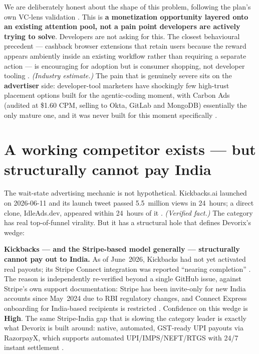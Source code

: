 We are deliberately honest about the shape of this problem, following the
plan's own VC-lens validation \citep{masterplan_2026}. This is
\textbf{a monetization opportunity layered onto an existing attention pool, not
a pain point developers are actively trying to solve}. Developers are not
asking for this. The closest behavioural precedent --- cashback browser
extensions that retain users because the reward appears ambiently inside an
existing workflow rather than requiring a separate action --- is encouraging
for adoption but is consumer shopping, not developer tooling
\citep{customerproduct_2026}. \emph{(Industry estimate.)} The pain that is
genuinely severe sits on the \textbf{advertiser} side: developer-tool marketers
have shockingly few high-trust placement options built for the agentic-coding
moment, with Carbon Ads (audited at \$1.60 CPM, selling to Okta, GitLab and
MongoDB) essentially the only mature one, and it was never built for this
moment specifically \citep{masterplan_2026}.

\section{A working competitor exists --- but structurally cannot pay India}

The wait-state advertising mechanic is not hypothetical. Kickbacks.ai launched
on 2026-06-11 and its launch tweet passed 5.5~million views in 24~hours; a
direct clone, IdleAds.dev, appeared within 24~hours of it
\citep{masterplan_2026}. \emph{(Verified fact.)} The category has real
top-of-funnel virality. But it has a structural hole that defines Devorix's
wedge:

\textbf{Kickbacks --- and the Stripe-based model generally --- structurally
cannot pay out to India.} As of June~2026, Kickbacks had not yet activated real
payouts; its Stripe Connect integration was reported ``nearing completion''
\citep{masterplan_2026}. The reason is independently re-verified beyond a
single GitHub issue, against Stripe's own support documentation: Stripe has
been invite-only for new India accounts since May~2024 due to RBI regulatory
changes, and Connect Express onboarding for India-based recipients is
restricted \citep{stripe_india_2026}. Confidence on this wedge is
\textbf{High}. The same Stripe-India gap that is slowing the category leader is
exactly what Devorix is built around: native, automated, GST-ready UPI payouts
via RazorpayX, which supports automated UPI/IMPS/NEFT/RTGS with 24/7 instant
settlement \citep{razorpayx_2026}.

